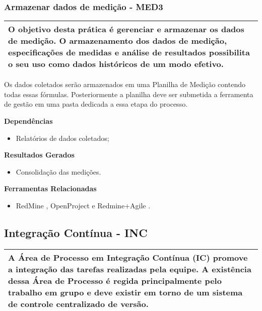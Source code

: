 \subsubsection{Armazenar dados de medição - MED3 }
\label{sec:med3}

\begin{table}[H]
\centering
\begin{tabular}{|p{130mm}|}
\hline
O objetivo desta prática é gerenciar e armazenar os dados de medição. O armazenamento dos dados de medição, especificações de medidas e análise de resultados possibilita o seu uso como dados históricos de um modo efetivo. \\ 
\hline
\end{tabular}
\end{table}

Os dados coletados serão armazenados em uma Planilha de Medição contendo todas essas fórmulas. Posteriormente a planilha deve ser submetida a ferramenta de gestão em uma pasta dedicada a essa etapa do processo.

\textbf{Dependências}

\begin{itemize}
    \item Relatórios de dados coletados;
\end{itemize}

\textbf{ Resultados Gerados }
\begin{itemize}
    \item Consolidação das medições.
\end{itemize}

\textbf{ Ferramentas Relacionadas }
\begin{itemize}
    \item RedMine \cite{Redmine}, OpenProject \cite{OpenProject} e Redmine+Agile \cite{RedmineUP}.
\end{itemize}

\subsection{Integração Contínua - INC}
\label{sec:inc}

\begin{table}[H]
\centering
\begin{tabular}{|p{130mm}|}
\hline
A Área de Processo em Integração Contínua (IC) promove a integração das tarefas realizadas pela equipe. A existência dessa Área de Processo é regida principalmente pelo trabalho em grupo e deve existir em torno de um sistema de controle centralizado de versão. \\
\hline
\end{tabular}
\end{table}

